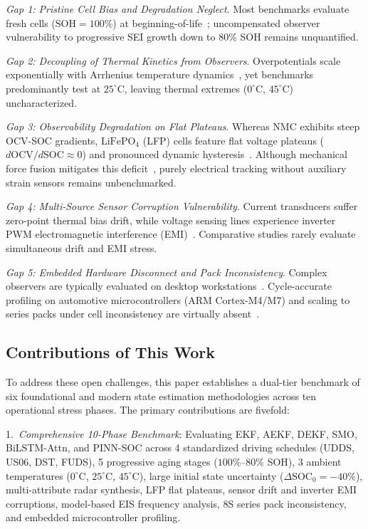 \documentclass[preprint,12pt]{elsarticle}
\begin{document}
\emph{Gap 1: Pristine Cell Bias and Degradation Neglect}. Most benchmarks evaluate fresh cells ($\text{SOH} = 100\%$) at beginning-of-life~\cite{Hu2012ecm,Chemali2018dnn,Le2026charging}; uncompensated observer vulnerability to progressive SEI growth down to $80\%$ SOH remains unquantified.

\emph{Gap 2: Decoupling of Thermal Kinetics from Observers}. Overpotentials scale exponentially with Arrhenius temperature dynamics~\cite{He2011ecm,Ren2019aging}, yet benchmarks predominantly test at $25^\circ\text{C}$, leaving thermal extremes ($0^\circ\text{C}$, $45^\circ\text{C}$) uncharacterized.

\emph{Gap 3: Observability Degradation on Flat Plateaus}. Whereas NMC exhibits steep OCV-SOC gradients, $\text{LiFePO}_4$ (LFP) cells feature flat voltage plateaus ($d\text{OCV}/d\text{SOC} \approx 0$) and pronounced dynamic hysteresis~\cite{Roscher2011hysteresis,Verbrugge2004hysteresis,Theiler2024hysteresis}. Although mechanical force fusion mitigates this deficit~\cite{Tian2025}, purely electrical tracking without auxiliary strain sensors remains unbenchmarked.

\emph{Gap 4: Multi-Source Sensor Corruption Vulnerability}. Current transducers suffer zero-point thermal bias drift, while voltage sensing lines experience inverter PWM electromagnetic interference (EMI)~\cite{Hashemi2020,Zheng2018inconsistency}. Comparative studies rarely evaluate simultaneous drift and EMI stress.

\emph{Gap 5: Embedded Hardware Disconnect and Pack Inconsistency}. Complex observers are typically evaluated on desktop workstations~\cite{Song2019bilstm,Bhattacharya2024gpr}. Cycle-accurate profiling on automotive microcontrollers (ARM Cortex-M4/M7) and scaling to series packs under cell inconsistency are virtually absent~\cite{Yang2024degradation,Zheng2018inconsistency}.

\subsection{Contributions of This Work}
To address these open challenges, this paper establishes a dual-tier benchmark of six foundational and modern state estimation methodologies across ten operational stress phases. The primary contributions are fivefold:

1.~\emph{Comprehensive 10-Phase Benchmark}: Evaluating EKF, AEKF, DEKF, SMO, BiLSTM-Attn, and PINN-SOC across 4 standardized driving schedules (UDDS, US06, DST, FUDS), 5 progressive aging stages ($100\%\text{--}80\%$ SOH), 3 ambient temperatures ($0^\circ\text{C}$, $25^\circ\text{C}$, $45^\circ\text{C}$), large initial state uncertainty ($\Delta\text{SOC}_0 = -40\%$), multi-attribute radar synthesis, LFP flat plateaus, sensor drift and inverter EMI corruptions, model-based EIS frequency analysis, 8S series pack inconsistency, and embedded microcontroller profiling.
\end{document}
